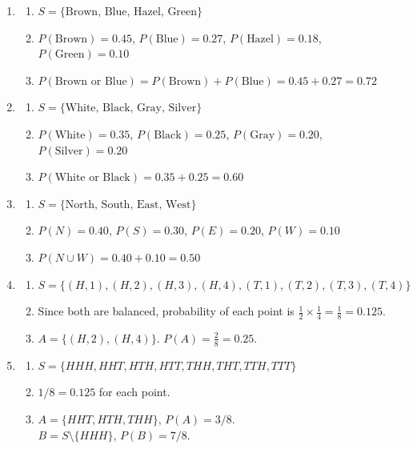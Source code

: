 \documentclass[11pt]{article}
\begin{document}
\begin{enumerate}
\item 
\begin{enumerate}
    \item $S = \{\text{Brown, Blue, Hazel, Green}\}$
    \item $P(\text{Brown})=0.45$, $P(\text{Blue})=0.27$, $P(\text{Hazel})=0.18$, $P(\text{Green})=0.10$
    \item $P(\text{Brown or Blue}) = P(\text{Brown}) + P(\text{Blue}) = 0.45 + 0.27 = 0.72$
\end{enumerate}

\item 
\begin{enumerate}
    \item $S = \{\text{White, Black, Gray, Silver}\}$
    \item $P(\text{White})=0.35$, $P(\text{Black})=0.25$, $P(\text{Gray})=0.20$, $P(\text{Silver})=0.20$
    \item $P(\text{White or Black}) = 0.35 + 0.25 = 0.60$
\end{enumerate}

\item 
\begin{enumerate}
    \item $S = \{\text{North, South, East, West}\}$
    \item $P(N)=0.40$, $P(S)=0.30$, $P(E)=0.20$, $P(W)=0.10$
    \item $P(N \cup W) = 0.40 + 0.10 = 0.50$
\end{enumerate}

\item 
\begin{enumerate}
    \item $S = \{(H,1), (H,2), (H,3), (H,4), (T,1), (T,2), (T,3), (T,4)\}$
    \item Since both are balanced, probability of each point is $\frac{1}{2} \times \frac{1}{4} = \frac{1}{8} = 0.125$.
    \item $A = \{(H,2), (H,4)\}$. $P(A) = \frac{2}{8} = 0.25$.
\end{enumerate}

\item 
\begin{enumerate}
    \item $S = \{HHH, HHT, HTH, HTT, THH, THT, TTH, TTT\}$
    \item $1/8 = 0.125$ for each point.
    \item $A = \{HHT, HTH, THH\}$, $P(A) = 3/8$. \\
          $B = S \setminus \{HHH\}$, $P(B) = 7/8$.
\end{enumerate}


\end{enumerate}
\end{document}
